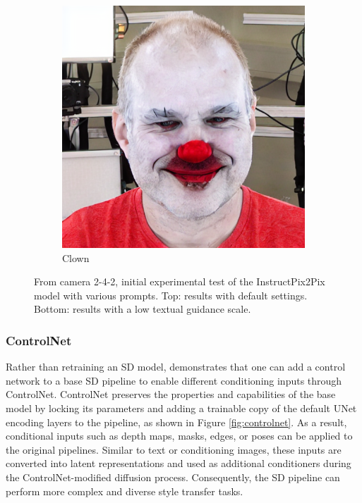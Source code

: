 \begin{figure}
\begin{subfigure}{0.18\linewidth}
        \includegraphics[width=\textwidth]{Figures/naive/low_cfg/ipix2pix_sven_clown/0-2-4-2-293_210300_829.png}
		\caption{Clown}
    \end{subfigure}
    \caption{From camera 2-4-2, initial experimental test of the InstructPix2Pix model with various prompts. Top: results with default settings. Bottom: results with a low textual guidance scale.}
    \label{fig:instructpix2pix_initial_2-4-2}

\end{figure}


\subsubsection{ControlNet}
Rather than retraining an SD model, \textcite{Zhang.2023} demonstrates that one can add a control network to a base SD pipeline to enable different conditioning inputs through ControlNet. ControlNet preserves the properties and capabilities of the base model by locking its parameters and adding a trainable copy of the default UNet encoding layers to the pipeline, as shown in Figure \ref{fig:controlnet}. As a result, conditional inputs such as depth maps, masks, edges, or poses can be applied to the original pipelines. Similar to text or conditioning images, these inputs are converted into latent representations and used as additional conditioners during the ControlNet-modified diffusion process. Consequently, the SD pipeline can perform more complex and diverse style transfer tasks. 

